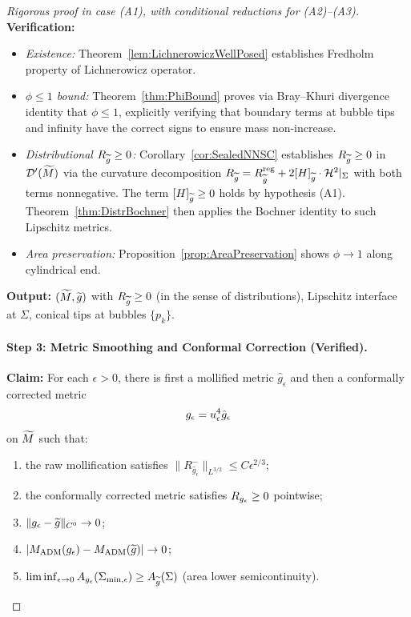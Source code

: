 \begin{proof}[Rigorous proof in case (A1), with conditional reductions for (A2)--(A3)]
\textbf{Verification:}
\begin{itemize}
    \item \textit{Existence:} Theorem~\ref{lem:LichnerowiczWellPosed} establishes Fredholm property of Lichnerowicz operator.
    \item \textit{$\phi \le 1$ bound:} Theorem~\ref{thm:PhiBound} proves via Bray--Khuri divergence identity that $\phi \le 1$, explicitly verifying that boundary terms at bubble tips and infinity have the correct signs to ensure mass non-increase.
    \item \textit{Distributional $R_{\widetilde{g}} \ge 0$:} Corollary~\ref{cor:SealedNNSC} establishes $R_{\widetilde{g}} \ge 0$ in $\mathcal{D}'(\widetilde{M})$ via the curvature decomposition $R_{\widetilde{g}} = R_{\widetilde{g}}^{\mathrm{reg}} + 2[H]_{\widetilde{g}} \cdot \mathcal{H}^2|_\Sigma$ with both terms nonnegative. The term $[H]_{\widetilde{g}} \ge 0$ holds by hypothesis (A1). Theorem~\ref{thm:DistrBochner} then applies the Bochner identity to such Lipschitz metrics.
    \item \textit{Area preservation:} Proposition~\ref{prop:AreaPreservation} shows $\phi \to 1$ along cylindrical end.
\end{itemize}
\textbf{Output:} $(\widetilde{M}, \widetilde{g})$ with $R_{\widetilde{g}} \ge 0$ (in the sense of distributions), Lipschitz interface at $\Sigma$, conical tips at bubbles $\{p_k\}$.

\paragraph{Step 3: Metric Smoothing and Conformal Correction (Verified).}
\textbf{Claim:} For each $\epsilon > 0$, there is first a mollified metric $\hat{g}_\epsilon$ and then a conformally corrected metric
\[
    g_{\epsilon}=u_\epsilon^4\hat{g}_\epsilon
\]
on $\widetilde{M}$ such that:
\begin{enumerate}
    \item the raw mollification satisfies $\|R^-_{\hat{g}_\epsilon}\|_{L^{3/2}} \le C\epsilon^{2/3}$;
    \item the conformally corrected metric satisfies $R_{g_{\epsilon}} \ge 0$ pointwise;
    \item $\|g_{\epsilon} - \widetilde{g}\|_{C^0} \to 0$;
    \item $|M_{\mathrm{ADM}}(g_{\epsilon}) - M_{\mathrm{ADM}}(\widetilde{g})| \to 0$;
    \item $\liminf_{\epsilon \to 0} A_{g_{\epsilon}}(\Sigma_{\min,\epsilon}) \ge A_{\widetilde{g}}(\Sigma)$ (area lower semicontinuity).
\end{enumerate}


\end{proof}
